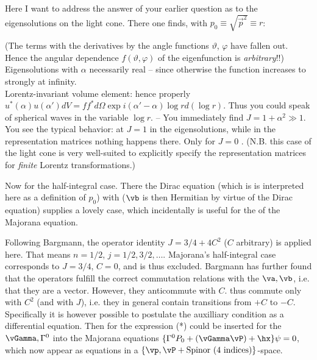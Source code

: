 Here I want to address the answer of your earlier question as to the eigensolutions on the light cone. There one finds, with $p_0 \equiv \sqrt{\vec{p}^2} \equiv r$:

(The terms with the derivatives by the angle functions $\vartheta$, $\varphi$ have fallen out. Hence the angular dependence  $f(\vartheta, \varphi)$ of the eigenfunction is \textit{arbitrary}!!)\\
Eigensolutions
with $\alpha$ necessarily real -- since otherwise the function increases to strongly at infinity.\\
Lorentz-invariant volume element:
hence properly $u^*(\alpha)u(\alpha'){dV} = ff^*{d\Omega}\exp{i(\alpha'-\alpha)\log{r}}{d(\log{r})}$. Thus you could speak of spherical waves in the variable $\log{r}$. -- You immediately find $J=1+\alpha^2 \gg 1$. You see the typical behavior: at $J=1$  in the eigensolutions, while in the representation matrices nothing happens there. Only for $J=0$ . (N.B. this case of the light cone is very well-suited to explicitly specify the representation matrices for \textit{finite} Lorentz transformations.)

Now for the half-integral case. There the Dirac equation
(which is is interpreted here as a definition of $p_0$) with
($\vb$ is then Hermitian by virtue of the Dirac equation) supplies a lovely case, which incidentally is useful for the  of the Majorana equation.

Following Bargmann, the operator identity $J=3/4 + 4C^2$ ($C$ arbitrary) is applied here. That means $n=1/2$, $j=1/2,3/2,\dots$. Majorana's half-integral case corresponds to $J=3/4$, $C=0$, and is thus excluded. Bargmann has further found that the operators
fulfill the correct commutation relations with the $\va, \vb$, i.e. that they are a vector. However, they anticommute with $C$.
thus commute only with $C^2$ (and with $J$), i.e. they in general contain transitions from $+C$ to $-C$. Specifically it is however possible to postulate the auxilliary condition
as a differential equation. Then for the expression (*) could be inserted for the $\vGamma, \Gamma^0$ into the Majorana equations $\{\Gamma^0 P_0 + (\vGamma\vP) + \hx\}\psi = 0$, which now appear as equations in a $\{\vp, \vP + \text{Spinor (4 indices)}\}$-space.

